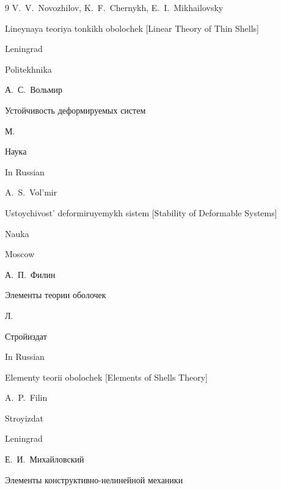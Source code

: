 \begin{thebibliography}{9}
\by  V.~V.~Novozhilov, K.~F.~Chernykh, E.~I.~Mikhailovsky

\book Lineynaya teoriya tonkikh obolochek \rm [Linear Theory of Thin Shells]

\publaddr Leningrad

\publ Politekhnika






\by А.~С.~Вольмир

\book Устойчивость деформируемых систем

\publaddr М.

\publ Наука



\misctransl

\lang In Russian

\by A.~S.~Vol'mir 

\book Ustoychivost' deformiruyemykh sistem \rm [Stability of Deformable Systems]

\publ Nauka

\publaddr Moscow 






\by А.~П.~Филин

\book Элементы теории оболочек

\publaddr Л.

\publ Стройиздат



\misctransl

\lang In Russian

\book Elementy teorii obolochek \rm [Elements of Shells Theory]

\by A.~P.~Filin 

\publ Stroyizdat

\publaddr Leningrad 






\by Е.~И.~Михайловский

\book Элементы конструктивно-нелинейной механики


\end{thebibliography}
